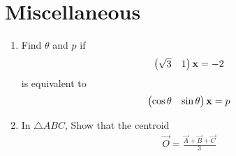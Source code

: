 \documentclass[journal,12pt,twocolumn]{IEEEtran}
\renewcommand\thesection{\arabic{section}}
\begin{document}
\section{Miscellaneous}
\renewcommand{\theequation}{\theenumi}
\begin{enumerate}[label=\thesection.\arabic*.,ref=\thesection.\theenumi]
\item Find $\theta$ and $p$ if 
%
\begin{align}
\begin{pmatrix}\sqrt{3} & 1\end{pmatrix}\mathbf{x} = -2
\end{align}
%
is equivalent to
%
\begin{align}
\begin{pmatrix}\cos\theta & \sin\theta\end{pmatrix}\mathbf{x} = p
\end{align}
\item In $\triangle ABC$, Show that the centroid 
\begin{align}
\vec{O} = \frac{\vec{A}+\vec{B}+\vec{C}}{3}
\end{align}
%


\end{enumerate}
\end{document}
